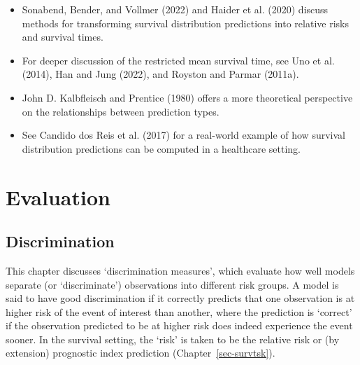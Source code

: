 \documentclass[
  letterpaper,
  krantz2]{style/krantz}
\providecommand{\tightlist}{%
  \setlength{\itemsep}{0pt}\setlength{\parskip}{0pt}}
\begin{document}
\begin{tcolorbox}[enhanced jigsaw, toprule=.15mm, bottomtitle=1mm, opacityback=0, breakable, leftrule=.75mm, title={Further reading}, toptitle=1mm, bottomrule=.15mm, colback=white, colframe=quarto-callout-tip-color-frame, titlerule=0mm, opacitybacktitle=0.6, coltitle=black, rightrule=.15mm, left=2mm, colbacktitle=quarto-callout-tip-color!10!white, arc=.35mm]

\begin{itemize}
\tightlist
\item
  Sonabend, Bender, and Vollmer (2022) and Haider et al. (2020) discuss
  methods for transforming survival distribution predictions into
  relative risks and survival times.
\item
  For deeper discussion of the restricted mean survival time, see Uno et
  al. (2014), Han and Jung (2022), and Royston and Parmar (2011a).
\item
  John D. Kalbfleisch and Prentice (1980) offers a more theoretical
  perspective on the relationships between prediction types.
\item
  See Candido dos Reis et al. (2017) for a real-world example of how
  survival distribution predictions can be computed in a healthcare
  setting.
\end{itemize}

\end{tcolorbox}

\part{Evaluation}

\chapter{Discrimination}\label{sec-eval-crank}

This chapter discusses `discrimination measures',
which evaluate how well models separate (or `discriminate') observations
into different risk groups. A model is said to have good discrimination
if it correctly predicts that one observation is at higher risk of the
event of interest than another, where the prediction is `correct' if the
observation predicted to be at higher risk does indeed experience the
event sooner. In the survival setting, the `risk' is taken to be the
relative risk or (by extension) prognostic
index prediction (Chapter~\ref{sec-survtsk}).
\end{document}
